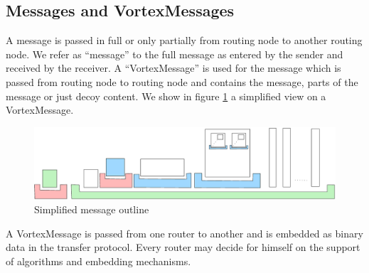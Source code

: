 \documentclass[10pt,journal,compsoc]{IEEEtran}
\let\MYoriglatexcaption\caption
\renewcommand{\caption}[2][\relax]{\MYoriglatexcaption[#2]{#2}}
\begin{document}
\subsection{Messages and VortexMessages}
A message is passed in full or only partially from routing node to another routing node. We refer as ``message'' to the full message as entered by the sender and received by the receiver. A ``VortexMessage'' is used for the message which is passed from routing node to routing node and contains the message, parts of the message or just decoy content. We show in figure  \ref{fig:messageOutline} a simplified view on a VortexMessage.

\begin{figure}[ht]
	\includegraphics[width=\textwidth]{../../inc/blockLayoutSimplified}
	\caption{Simplified message outline}
	\label{fig:messageOutline}
\end{figure}

A VortexMessage is passed from one router to another and is embedded as binary data in the transfer protocol. Every router may decide for himself on the support of algorithms and embedding mechanisms.
\end{document}
